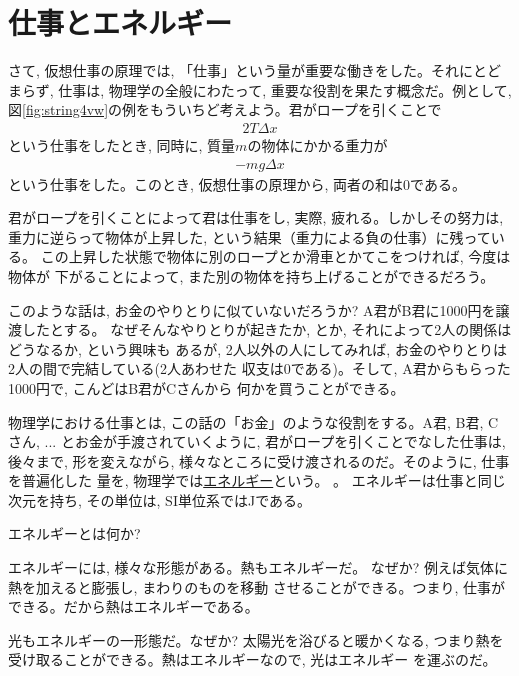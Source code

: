 \section{仕事とエネルギー}

さて, 仮想仕事の原理では, 「仕事」という量が重要な働きをした。それにとどまらず, 
仕事は, 物理学の全般にわたって, 重要な役割を果たす概念だ。例として, 
図\ref{fig:string4vw}の例をもういちど考えよう。君がロープを引くことで
\begin{eqnarray*}2T\Delta x\end{eqnarray*}
という仕事をしたとき, 同時に, 質量$m$の物体にかかる重力が
\begin{eqnarray}-mg\Delta x\end{eqnarray}
という仕事をした。このとき, 仮想仕事の原理から, 両者の和は0である。

君がロープを引くことによって君は仕事をし, 実際, 疲れる。しかしその努力は, 
重力に逆らって物体が上昇した, という結果（重力による負の仕事）に残っている。
この上昇した状態で物体に別のロープとか滑車とかてこをつければ, 今度は物体が
下がることによって, また別の物体を持ち上げることができるだろう。

このような話は, お金のやりとりに似ていないだろうか? A君がB君に1000円を譲渡したとする。
なぜそんなやりとりが起きたか, とか, それによって2人の関係はどうなるか, という興味も
あるが, 2人以外の人にしてみれば, お金のやりとりは2人の間で完結している(2人あわせた
収支は0である)。そして, A君からもらった1000円で, こんどはB君がCさんから
何かを買うことができる。

物理学における仕事とは, この話の「お金」のような役割をする。A君, B君, Cさん, ...
とお金が手渡されていくように, 君がロープを引くことでなした仕事は, 後々まで, 形を変えながら, 
様々なところに受け渡されるのだ。そのように, 仕事を普遍化した
量を, 物理学では\underline{エネルギー}という。
。
エネルギーは仕事と同じ次元を持ち, その単位は, SI単位系ではJである。

\begin{q}\label{q:energy}
エネルギーとは何か? 
\end{q}

エネルギーには, 様々な形態がある。熱もエネルギーだ。
なぜか? 例えば気体に熱を加えると膨張し, まわりのものを移動
させることができる。つまり, 仕事ができる。だから熱はエネルギーである。

光もエネルギーの一形態だ。なぜか? 太陽光を浴びると暖かくなる, 
つまり熱を受け取ることができる。熱はエネルギーなので, 光はエネルギー
を運ぶのだ。

